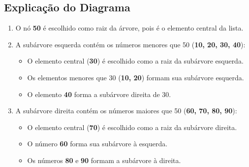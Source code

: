 \documentclass[a4paper,12pt]{article}
\begin{document}
\subsection*{Explicação do Diagrama}
\begin{enumerate}
    \item O nó \textbf{50} é escolhido como raiz da árvore, pois é o elemento central da lista.
    \item A subárvore esquerda contém os números menores que 50 (\textbf{10, 20, 30, 40}):
    \begin{itemize}
        \item O elemento central (\textbf{30}) é escolhido como a raiz da subárvore esquerda.
        \item Os elementos menores que 30 (\textbf{10, 20}) formam sua subárvore esquerda.
        \item O elemento \textbf{40} forma a subárvore direita de 30.
    \end{itemize}
    \item A subárvore direita contém os números maiores que 50 (\textbf{60, 70, 80, 90}):
    \begin{itemize}
        \item O elemento central (\textbf{70}) é escolhido como a raiz da subárvore direita.
        \item O número \textbf{60} forma sua subárvore à esquerda.
        \item Os números \textbf{80} e \textbf{90} formam a subárvore à direita.
    \end{itemize}
\end{enumerate}
\end{document}
